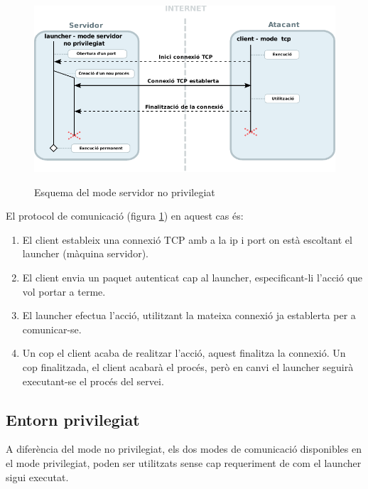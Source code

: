 \begin{figure}[htp]
    \centering
    \includegraphics[scale=1.2,keepaspectratio]{diagrames/solutionDesignUnprivilegedServerMode.pdf} \\
    \caption{Esquema del mode servidor no privilegiat}
    \label{fig:modeUnprivilegedServer}
\end{figure}

El protocol de comunicació (figura \ref{fig:modeUnprivilegedServer}) en aquest cas és: \\

\begin{enumerate}
    \item El client estableix una connexió TCP amb a la ip i port on està escoltant el launcher (màquina servidor).
    \item El client envia un paquet autenticat cap al launcher, especificant-li l'acció que vol portar a terme.
    \item El launcher efectua l'acció, utilitzant la mateixa connexió ja establerta per a comunicar-se.
    \item Un cop el client acaba de realitzar l'acció, aquest finalitza la connexió. Un cop finalitzada, el client acabarà el 
        procés, però en canvi el launcher seguirà executant-se el procés del servei.
\end{enumerate}

\subsection{Entorn privilegiat}

A diferència del mode no privilegiat, els dos modes de comunicació disponibles en el mode privilegiat, poden ser 
utilitzats sense cap requeriment de com el launcher sigui executat. \\

